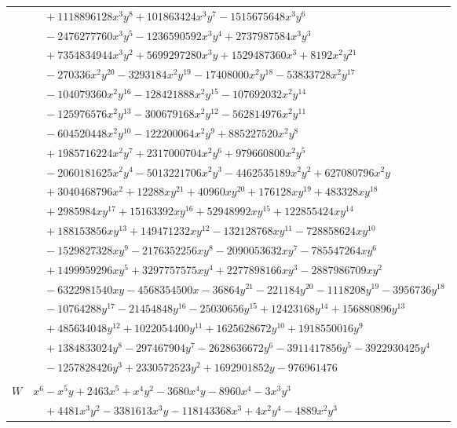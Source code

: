 \documentclass[11pt]{article}
\begin{document}
\begin{longtable}{@{}ll@{}}
 & $\quad +1118896128x^{3}y^{8}+101863424x^{3}y^{7}-1515675648x^{3}y^{6}$\\
 & $\quad -2476277760x^{3}y^{5}-1236590592x^{3}y^{4}+2737987584x^{3}y^{3}$\\
 & $\quad +7354834944x^{3}y^{2}+5699297280x^{3}y+1529487360x^{3}+8192x^{2}y^{21}$\\
 & $\quad -270336x^{2}y^{20}-3293184x^{2}y^{19}-17408000x^{2}y^{18}-53833728x^{2}y^{17}$\\
 & $\quad -104079360x^{2}y^{16}-128421888x^{2}y^{15}-107692032x^{2}y^{14}$\\
 & $\quad -125976576x^{2}y^{13}-300679168x^{2}y^{12}-562814976x^{2}y^{11}$\\
 & $\quad -604520448x^{2}y^{10}-122200064x^{2}y^{9}+885227520x^{2}y^{8}$\\
 & $\quad +1985716224x^{2}y^{7}+2317000704x^{2}y^{6}+979660800x^{2}y^{5}$\\
 & $\quad -2060181625x^{2}y^{4}-5013221706x^{2}y^{3}-4462535189x^{2}y^{2}+627080796x^{2}y$\\
 & $\quad +3040468796x^{2}+12288xy^{21}+40960xy^{20}+176128xy^{19}+483328xy^{18}$\\
 & $\quad +2985984xy^{17}+15163392xy^{16}+52948992xy^{15}+122855424xy^{14}$\\
 & $\quad +188153856xy^{13}+149471232xy^{12}-132128768xy^{11}-728858624xy^{10}$\\
 & $\quad -1529827328xy^{9}-2176352256xy^{8}-2090053632xy^{7}-785547264xy^{6}$\\
 & $\quad +1499959296xy^{5}+3297757575xy^{4}+2277898166xy^{3}-2887986709xy^{2}$\\
 & $\quad -6322981540xy-4568354500x-36864y^{21}-221184y^{20}-1118208y^{19}-3956736y^{18}$\\
 & $\quad -10764288y^{17}-21454848y^{16}-25030656y^{15}+12423168y^{14}+156880896y^{13}$\\
 & $\quad +485634048y^{12}+1022054400y^{11}+1625628672y^{10}+1918550016y^{9}$\\
 & $\quad +1384833024y^{8}-297467904y^{7}-2628636672y^{6}-3911417856y^{5}-3922930425y^{4}$\\
 & $\quad -1257828426y^{3}+2330572523y^{2}+1692901852y-976961476$\\
\addlinespace[3pt]
\multicolumn{2}{@{}l}{$i=2$, $m=31104$, neighbours $7,8,41,45,48,56,57,82,89,90,91,92,93,94,95,193,195$}\\
$W$ & $x^{6}-x^{5}y+2463x^{5}+x^{4}y^{2}-3680x^{4}y-8960x^{4}-3x^{3}y^{3}$\\
 & $\quad +4481x^{3}y^{2}-3381613x^{3}y-118143368x^{3}+4x^{2}y^{4}-4889x^{2}y^{3}$\\

\end{longtable}
\end{document}

